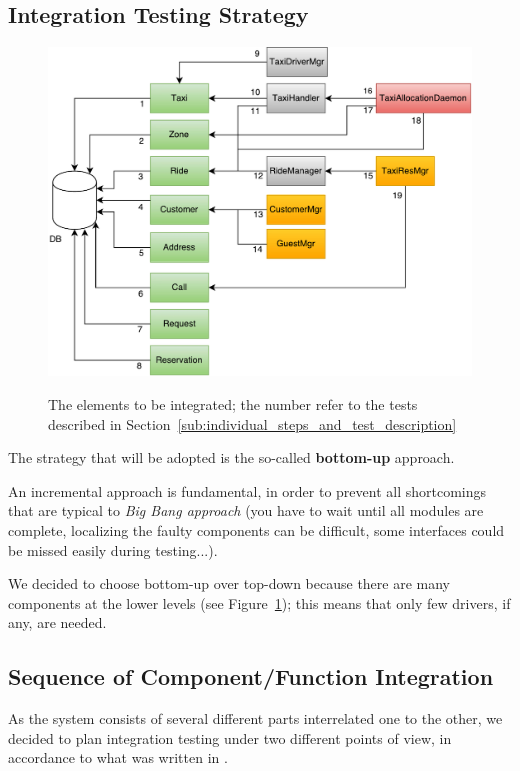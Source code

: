 \documentclass[a4paper, 12pt]{article}
\newcounter{tc}
\begin{document}
\subsection{Integration Testing Strategy}
\label{sub:integration_testing_strategy}
\begin{figure}[htb]
    \centering
    \includegraphics[width=1.2\textwidth]{img/elements.pdf}
    \label{fig:testplan}
    \caption{The elements to be integrated; the number refer to the tests described in Section~\ref{sub:individual_steps_and_test_description}}
\end{figure}

The strategy that will be adopted is the so-called \textbf{bottom-up} approach.

An incremental approach is fundamental, in order to prevent all shortcomings that are typical to \emph{Big Bang approach} (you have to wait until all modules are complete, localizing the faulty components can be difficult, some interfaces could be missed easily during testing...).

We decided to choose bottom-up over top-down because there are many components at the lower levels (see Figure~\ref{fig:testplan}); this means that only few drivers, if any, are needed.

\newpage
\subsection{Sequence of Component/Function Integration}
\label{sub:sequence_of_component_function_integration}
As the system consists of several different parts interrelated one to the other, we decided to plan integration testing under two different points of view, in accordance to what was written in \cite[p.~4]{bib:dd}.
\end{document}
